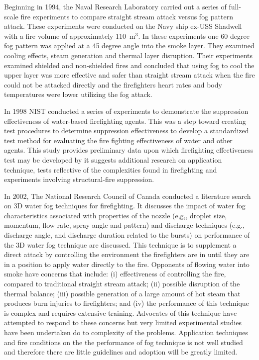 \documentclass[12pt,oneside]{book}
\begin{document}
Beginning in 1994, the Naval Research Laboratory carried out a series of full-scale fire experiments to compare straight stream attack versus fog pattern attack. These experiments were conducted on the Navy ship ex-USS Shadwell with a fire volume of approximately 110~m$^3$. In these experiments one 60 degree fog pattern was applied at a 45 degree angle into the smoke layer. They examined cooling effects, steam generation and thermal layer disruption. Their experiments examined shielded and non-shielded fires and concluded that using fog to cool the upper layer was more effective and safer than straight stream attack when the fire could not be attacked directly and the firefighters heart rates and body temperatures were lower utilizing the fog attack.

In 1998 NIST conducted a series of experiments to demonstrate the suppression effectiveness of water-based firefighting agents. This was a step toward creating test procedures to determine suppression effectiveness to develop a standardized test method for evaluating the fire fighting effectiveness of water and other agents. This study provides preliminary data upon which firefighting effectiveness test may be developed by it suggests additional research on application technique, tests reflective of the complexities found in firefighting and experiments involving structural-fire suppression.  

In 2002, The National Research Council of Canada conducted a literature search on 3D water fog techniques for firefighting. It discusses the impact of water fog characteristics associated with properties of the nozzle (e,g,, droplet size, momentum, flow rate, spray angle and pattern) and discharge techniques (e.g., discharge angle, and discharge duration related to the bursts) on performance of the 3D water fog technique are discussed. This technique is to supplement a direct attack by controlling the environment the firefighters are in until they are in a position to apply water directly to the fire. Opponents of flowing water into smoke have concerns that include: (i) effectiveness of controlling the fire, compared to traditional straight stream attack; (ii) possible disruption of the thermal balance; (iii) possible generation of a large amount of hot steam that produces burn injuries to firefighters; and (iv) the performance of this technique is complex and requires extensive training. Advocates of this technique have attempted to respond to these concerns but very limited experimental studies have been undertaken do to complexity of the problems. Application techniques and fire conditions on the the performance of fog technique is not well studied and therefore there are little guidelines and adoption will be greatly limited.
\end{document}
